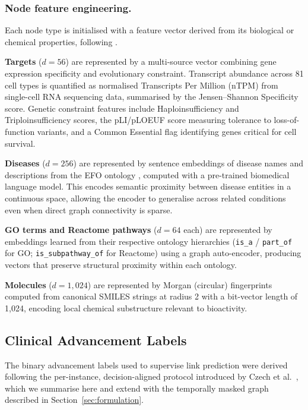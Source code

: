 \documentclass[a4,center]{NAR}
\begin{document}
{\subsubsection{Node feature engineering.}
\label{sec:thbkg_features}

Each node type is initialised with a feature vector derived from its
biological or chemical properties, following \citet{Narganes-Carlon2024GATher:Links}.

\textbf{Targets} ($d = 56$) are represented by a multi-source vector combining gene
expression specificity and evolutionary constraint. Transcript abundance
across 81 cell types is quantified as normalised Transcripts Per Million
(nTPM) from single-cell RNA sequencing data, summarised by the
Jensen--Shannon Specificity score. Genetic constraint features include
Haploinsufficiency and Triploinsufficiency scores, the pLI/pLOEUF score
measuring tolerance to loss-of-function variants, and a Common Essential
flag identifying genes critical for cell survival.

\textbf{Diseases} ($d = 256$) are represented by sentence embeddings of disease names
and descriptions from the EFO ontology \citep{Ochoa2021OpenPrioritisation}, computed with a
pre-trained biomedical language model. This encodes semantic proximity
between disease entities in a continuous space, allowing the encoder to
generalise across related conditions even when direct graph connectivity
is sparse.

\textbf{GO terms and Reactome pathways} ($d = 64$ each) are represented by embeddings
learned from their respective ontology hierarchies (\texttt{is\_a} /
\texttt{part\_of} for GO; \texttt{is\_subpathway\_of} for Reactome) using
a graph auto-encoder, producing vectors that preserve structural proximity
within each ontology.

\textbf{Molecules} ($d = 1{,}024$) are represented by Morgan (circular)
fingerprints computed from canonical SMILES strings at radius 2 with a
bit-vector length of 1{,}024, encoding local chemical substructure relevant
to bioactivity.




\subsection{Clinical Advancement Labels}
\label{sec:advancement_labels}

The binary advancement labels used to supervise link prediction were derived
following the per-instance, decision-aligned protocol introduced by Czech
et al.\ \citep{Czech2024CLINICALFORECASTING}, which we summarise here and extend with the
temporally masked graph described in
Section~\ref{sec:formulation}.

}
\end{document}
